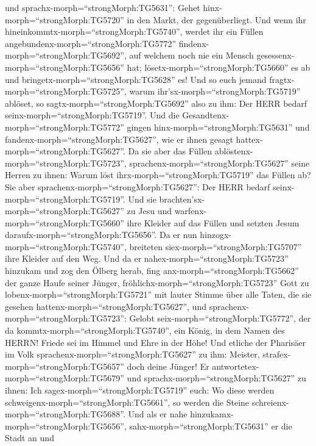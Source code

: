 und sprachx-morph=``strongMorph:TG5631'': Gehet
hinx-morph=``strongMorph:TG5720'' in den Markt, der gegenüberliegt. Und
wenn ihr hineinkommtx-morph=``strongMorph:TG5740'', werdet ihr ein
Füllen angebundenx-morph=``strongMorph:TG5772''
findenx-morph=``strongMorph:TG5692'', auf welchem noch nie ein Mensch
gesessenx-morph=``strongMorph:TG5656'' hat;
lösetx-morph=``strongMorph:TG5660'' es ab und
bringetx-morph=``strongMorph:TG5628'' es!  Und so euch
jemand fragtx-morph=``strongMorph:TG5725'', warum
ihr'sx-morph=``strongMorph:TG5719'' ablöset, so
sagtx-morph=``strongMorph:TG5692'' also zu ihm: Der HERR bedarf
seinx-morph=``strongMorph:TG5719''.  Und die
Gesandtenx-morph=``strongMorph:TG5772'' gingen
hinx-morph=``strongMorph:TG5631'' und
fandenx-morph=``strongMorph:TG5627'', wie er ihnen gesagt
hattex-morph=``strongMorph:TG5627''.  Da sie aber das
Füllen ablöstenx-morph=``strongMorph:TG5723'',
sprachenx-morph=``strongMorph:TG5627'' seine Herren zu ihnen: Warum löst
ihrx-morph=``strongMorph:TG5719'' das Füllen ab?  Sie aber
sprachenx-morph=``strongMorph:TG5627'': Der HERR bedarf
seinx-morph=``strongMorph:TG5719''.  Und sie
brachten'sx-morph=``strongMorph:TG5627'' zu Jesu und
warfenx-morph=``strongMorph:TG5660'' ihre Kleider auf das Füllen und
setzten Jesum daraufx-morph=``strongMorph:TG5656''.  Da er
nun hinzogx-morph=``strongMorph:TG5740'', breiteten
siex-morph=``strongMorph:TG5707'' ihre Kleider auf den Weg.
 Und da er nahex-morph=``strongMorph:TG5723'' hinzukam und
zog den Ölberg herab, fing anx-morph=``strongMorph:TG5662'' der ganze
Haufe seiner Jünger, fröhlichx-morph=``strongMorph:TG5723'' Gott zu
lobenx-morph=``strongMorph:TG5721'' mit lauter Stimme über alle Taten,
die sie gesehen hattenx-morph=``strongMorph:TG5627'',  und
sprachenx-morph=``strongMorph:TG5723'': Gelobt
seix-morph=``strongMorph:TG5772'', der da
kommtx-morph=``strongMorph:TG5740'', ein König, in dem Namen des HERRN!
Friede sei im Himmel und Ehre in der Höhe!  Und etliche der
Pharisäer im Volk sprachenx-morph=``strongMorph:TG5627'' zu ihm:
Meister, strafex-morph=``strongMorph:TG5657'' doch deine Jünger!
 Er antwortetex-morph=``strongMorph:TG5679'' und
sprachx-morph=``strongMorph:TG5627'' zu ihnen: Ich
sagex-morph=``strongMorph:TG5719'' euch: Wo diese werden
schweigenx-morph=``strongMorph:TG5661'', so werden die Steine
schreienx-morph=``strongMorph:TG5688''.  Und als er nahe
hinzukamx-morph=``strongMorph:TG5656'',
sahx-morph=``strongMorph:TG5631'' er die Stadt an und
